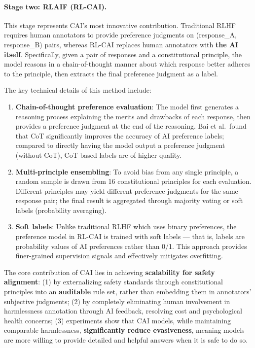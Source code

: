 \paragraph{Stage two: RLAIF (RL-CAI).}
This stage represents CAI's most innovative contribution.
Traditional RLHF requires human annotators to provide preference judgments on (response\_A, response\_B) pairs,
whereas RL-CAI replaces human annotators with \textbf{the AI itself}.
Specifically, given a pair of responses and a constitutional principle,
the model reasons in a chain-of-thought manner about which response better adheres to the principle,
then extracts the final preference judgment as a label.

The key technical details of this method include:

\begin{enumerate}[leftmargin=2em]
  \item \textbf{Chain-of-thought preference evaluation}:
    The model first generates a reasoning process explaining the merits and drawbacks of each response,
    then provides a preference judgment at the end of the reasoning.
    Bai et al.\ found that CoT significantly improves the accuracy of AI preference labels;
    compared to directly having the model output a preference judgment (without CoT), CoT-based labels are of higher quality.

  \item \textbf{Multi-principle ensembling}:
    To avoid bias from any single principle, a random sample is drawn from 16 constitutional principles for each evaluation.
    Different principles may yield different preference judgments for the same response pair;
    the final result is aggregated through majority voting or soft labels (probability averaging).

  \item \textbf{Soft labels}:
    Unlike traditional RLHF which uses binary preferences,
    the preference model in RL-CAI is trained with soft labels ---
    that is, labels are probability values of AI preferences rather than 0/1.
    This approach provides finer-grained supervision signals and effectively mitigates overfitting.
\end{enumerate}

\begin{solutionbox}
The core contribution of CAI lies in achieving \textbf{scalability for safety alignment}:
(1) by externalizing safety standards through constitutional principles into an \textbf{auditable} rule set, rather than embedding them in annotators' subjective judgments;
(2) by completely eliminating human involvement in harmlessness annotation through AI feedback, resolving cost and psychological health concerns;
(3) experiments show that CAI models, while maintaining comparable harmlessness,
\textbf{significantly reduce evasiveness}, meaning models are more willing to provide detailed and helpful answers when it is safe to do so.
\end{solutionbox}

